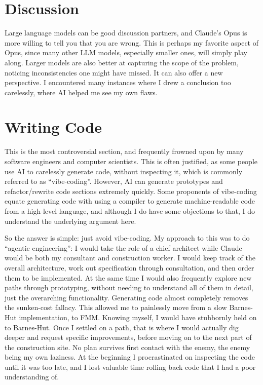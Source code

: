 \section{Discussion}

Large language models can be good discussion partners, and Claude's Opus is more willing to tell you that you are wrong.
This is perhaps my favorite aspect of Opus, since many other LLM models, especially smaller ones, will simply play along.
Larger models are also better at capturing the scope of the problem, noticing inconsistencies one might have missed.
It can also offer a new perspective.
I encountered many instances where I drew a conclusion too carelessly, where AI helped me see my own flaws.

\section{Writing Code}

This is the most controversial section, and frequently frowned upon by many software engineers and computer scientists.
This is often justified, as some people use AI to carelessly generate code, without inspecting it, which is commonly referred to as ``vibe-coding''.
However, AI can generate prototypes and refactor/rewrite code sections extremely quickly.
Some proponents of vibe-coding equate generating code with using a compiler to generate machine-readable code from a high-level language, and although I do have some objections to that, I do understand the underlying argument here.

So the answer is simple: just avoid vibe-coding.
My approach to this was to do ``agentic engineering'': I would take the role of a chief architect while Claude would be both my consultant and construction worker.
I would keep track of the overall architecture, work out specification through consultation, and then order them to be implemented.
At the same time I would also frequently explore new paths through prototyping, without needing to understand all of them in detail, just the overarching functionality.
Generating code almost completely removes the sunken-cost fallacy.
This allowed me to painlessly move from a slow Barnes-Hut implementation, to FMM.
Knowing myself, I would have stubbornly held on to Barnes-Hut.
Once I settled on a path, that is where I would actually dig deeper and request specific improvements, before moving on to the next part of the construction site.
No plan survives first contact with the enemy, the enemy being my own laziness.
At the beginning I procrastinated on inspecting the code until it was too late, and I lost valuable time rolling back code that I had a poor understanding of.

